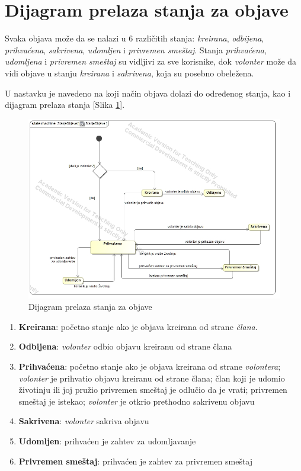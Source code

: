 \section{Dijagram prelaza stanja za objave}
\par Svaka objava može da se nalazi u 6 različitih stanja: \textit{kreirana}, \textit{odbijena},
\textit{prihvaćena}, \textit{sakrivena}, \textit{udomljen} i \textit{privremen smeštaj}. 
Stanja \textit{prihvaćena}, \textit{udomljena} i \textit{privremen smeštaj} su vidljivi za sve korisnike,
dok \textit{volonter} može da vidi objave u stanju \textit{kreirana} i \textit{sakrivena}, koja su posebno obeležena.
\par U nastavku je navedeno na koji način objava dolazi do određenog stanja, kao i dijagram prelaza stanja [Slika \ref{fig:state}].
\begin{figure}[h]
    \centering
    \includegraphics[width=\textwidth]{img/state.jpg}
    \caption{Dijagram prelaza stanja za objave}
    \label{fig:state}
\end{figure}
\begin{enumerate}
    \item \textbf{Kreirana}: početno stanje ako je objava kreirana od strane \textit{člana}.
    \item \textbf{Odbijena}: \textit{volonter} odbio objavu kreiranu od strane člana
    \item \textbf{Prihvaćena}: 
        početno stanje ako je objava kreirana od strane \textit{volontera}; 
        \textit{volonter} je prihvatio objavu kreiranu od strane člana;
        član koji je udomio životinju ili joj pružio privremen smeštaj je odlučio da je vrati;
        privremen smeštaj je istekao;
        \textit{volonter} je otkrio prethodno sakrivenu objavu
    \item \textbf{Sakrivena}: \textit{volonter} sakriva objavu
    \item \textbf{Udomljen}: prihvaćen je zahtev za udomljavanje
    \item \textbf{Privremen smeštaj}: prihvaćen je zahtev za privremen smeštaj
\end{enumerate}
